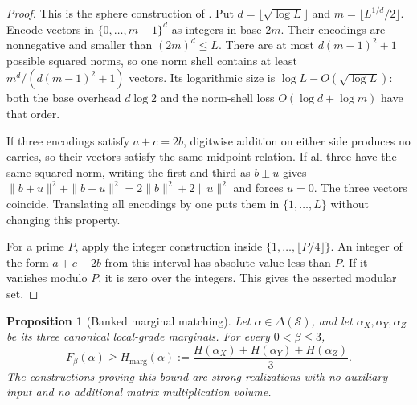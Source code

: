 \documentclass[11pt]{article}
\numberwithin{equation}{section}
\newtheorem{proposition}[theorem]{Proposition}
\theoremstyle{definition}
\theoremstyle{remark}
\begin{document}
\begin{proof}
This is the sphere construction of \citet{behrend}.  Put
$d=\lfloor\sqrt{\log L}\rfloor$ and
$m=\lfloor L^{1/d}/2\rfloor$.  Encode vectors in
$\{0,\ldots,m-1\}^d$ as integers in base $2m$.  Their encodings are
nonnegative and smaller than $(2m)^d\le L$.  There are at most
$d(m-1)^2+1$ possible squared norms, so one norm shell contains at least
$m^d/(d(m-1)^2+1)$ vectors.  Its logarithmic size is
$\log L-O(\sqrt{\log L})$: both the base overhead $d\log2$ and the
norm-shell loss $O(\log d+\log m)$ have that order.

If three encodings satisfy $a+c=2b$, digitwise addition on either side
produces no carries, so their vectors satisfy the same midpoint relation.
If all three have the same squared norm, writing the first and third as
$b\pm u$ gives $\|b+u\|^2+\|b-u\|^2=2\|b\|^2+2\|u\|^2$ and forces
$u=0$.  The three vectors coincide.  Translating all encodings by one puts
them in $\{1,\ldots,L\}$ without changing this property.

For a prime $P$, apply the integer construction inside
$\{1,\ldots,\lfloor P/4\rfloor\}$.  An integer of the form $a+c-2b$
from this interval has absolute value less than $P$.  If it vanishes modulo
$P$, it is zero over the integers.  This gives the asserted modular set.
\end{proof}

\begin{proposition}[Banked marginal matching]
\label{prop:matching}
Let $\alpha\in\Delta(\mathcal S)$, and let
$\alpha_X,\alpha_Y,\alpha_Z$ be its three canonical local-grade marginals.
For every $0<\beta\le3$,
\begin{equation}
 F_\beta(\alpha)\ge H_{\mathrm{marg}}(\alpha)
 :=\frac{H(\alpha_X)+H(\alpha_Y)+H(\alpha_Z)}3.
\label{val:matching-bound}
\end{equation}
The constructions proving this bound are strong realizations with no
auxiliary input and no additional matrix multiplication volume.
\end{proposition}
\end{document}
